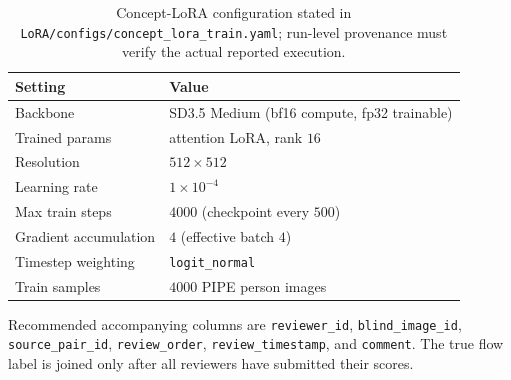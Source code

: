 \documentclass[11pt,a4paper]{article}
\begin{document}
\begin{table}[h]
  \centering
  \caption[Configured training profile]{Concept-LoRA configuration stated in
  \nolinkurl{LoRA/configs/concept_lora_train.yaml}; run-level provenance must
  verify the actual reported execution.}
  \label{tab:train}
  \begin{tabular}{@{}ll@{}}
    \toprule
    Setting & Value \\
    \midrule
    Backbone              & SD3.5 Medium (bf16 compute, fp32 trainable) \\
    Trained params        & attention LoRA, rank $16$ \\
    Resolution            & $512\times512$ \\
    Learning rate         & $1\times10^{-4}$ \\
    Max train steps       & $4000$ (checkpoint every $500$) \\
    Gradient accumulation & $4$ (effective batch $4$) \\
    Timestep weighting    & \texttt{logit\_normal} \\
    Train samples         & $4000$ PIPE person images \\
    \bottomrule
  \end{tabular}
\end{table}





Recommended accompanying columns are \texttt{reviewer\_id}, \texttt{blind\_image\_id}, \texttt{source\_pair\_id}, \texttt{review\_order}, \texttt{review\_timestamp}, and \texttt{comment}. The true flow label is joined only after all reviewers have submitted their scores.
\end{document}
